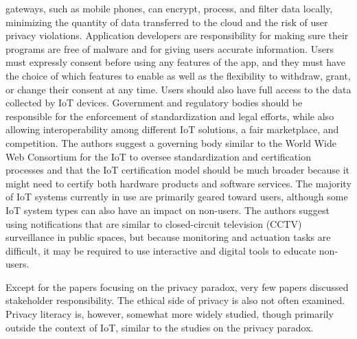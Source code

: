gateways, such as mobile phones, can encrypt, process, and filter data locally,
minimizing the quantity of data transferred to the cloud and the risk of user
privacy violations. Application developers are responsibility for making sure
their programs are free of malware and for giving users accurate information.
Users must expressly consent before using any features of the app, and they must
have the choice of which features to enable as well as the flexibility to withdraw,
grant, or change their consent at any time. Users should also have full access
to the data collected by IoT devices. Government and regulatory bodies should be
responsible for the enforcement of standardization and legal efforts, while also
allowing interoperability among different IoT solutions, a fair marketplace,
and competition. The authors suggest a governing body similar to the World Wide
Web Consortium for the IoT to oversee standardization and certification processes
and that the IoT certification model should be much broader because it might need
to certify both hardware products and software services.
The majority of IoT systems currently in use are primarily geared toward users,
although some IoT system types can also have an impact on non-users. The authors
suggest using notifications that are similar to closed-circuit television (CCTV) surveillance in public spaces,
but because monitoring and actuation tasks are difficult, it may be required to use
interactive and digital tools to educate non-users.

Except for the papers focusing on the privacy paradox, very few papers discussed
stakeholder responsibility. The ethical side of privacy is also not often examined.
Privacy literacy is, however, somewhat more widely studied, though primarily
outside the context of IoT, similar to the studies on the privacy paradox.
